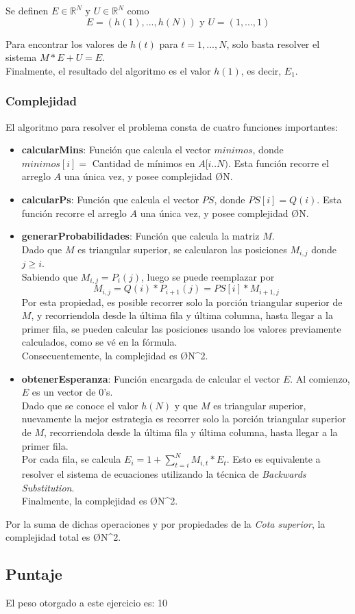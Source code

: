 \noindent Se definen $E \in \mathbb{R}^N$ y $U \in \mathbb{R}^N$ como
\[ E = (h(1),...,h(N))\text{ y }U = (1,...,1) \]

\noindent Para encontrar los valores de $h(t)$ para $t = 1,...,N$, solo basta resolver el sistema $M*E + U = E$.\\

\noindent Finalmente, el resultado del algoritmo es el valor $h(1)$, es decir, $E_1$.

\subsubsection{Complejidad}
El algoritmo para resolver el problema consta de cuatro funciones importantes:
\begin{itemize}
	\item \textbf{calcularMins}: Función que calcula el vector $minimos$, donde $minimos[i] = $ Cantidad de mínimos en $A[i..N)$. Esta función recorre el arreglo $A$ una única vez, y posee complejidad \O{N}.
	\item \textbf{calcularPs}: Función que calcula el vector $PS$, donde $PS[i] = Q(i)$. Esta función recorre el arreglo $A$ una única vez, y posee complejidad \O{N}.
	\item \textbf{generarProbabilidades}: Función que calcula la matriz $M$. \\
	Dado que $M$ es triangular superior, se calcularon las posiciones $M_{i,j}$ donde $j \geq i$. \\
	Sabiendo que $M_{i,j} = P_i(j)$, luego se puede reemplazar por \[ M_{i,j} = Q(i) * P_{i+1}(j) = PS[i] * M_{i+1,j} \]
	Por esta propiedad, es posible recorrer solo la porción triangular superior de $M$, y recorriendola desde la última fila y última columna, hasta llegar a la primer fila, se pueden calcular las posiciones usando los valores previamente calculados, como se vé en la fórmula.\\
	Consecuentemente, la complejidad es \O{N^2}.
	\item \textbf{obtenerEsperanza}: Función encargada de calcular el vector $E$. Al comienzo, $E$ es un vector de $0$'s. \\
	Dado que se conoce el valor $h(N)$ y que $M$ es triangular superior, nuevamente la mejor estrategia es recorrer solo la porción triangular superior de $M$, recorriendola desde la última fila y última columna, hasta llegar a la primer fila.\\
	Por cada fila, se calcula $\displaystyle E_i = 1 + \sum_{t = i}^{N} M_{i,t}*E_{t}$. Esto es equivalente a resolver el sistema de ecuaciones utilizando la técnica de \emph{Backwards Substitution}\textsuperscript{\cite{backsust}}.\\
	Finalmente, la complejidad es \O{N^2}.
\end{itemize}

\noindent Por la suma de dichas operaciones y por propiedades de la \emph{Cota superior}, la complejidad total es \O{N^2}.

\subsection{Puntaje}
El peso otorgado a este ejercicio es: 10
